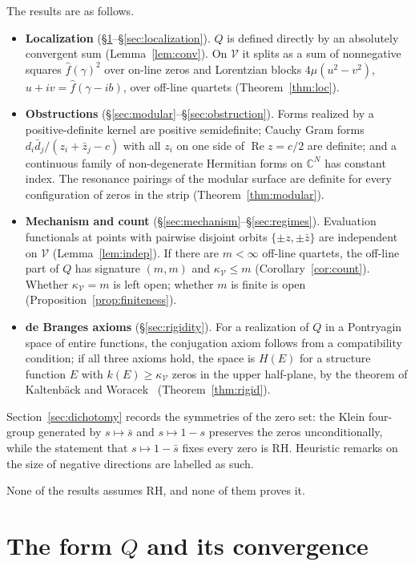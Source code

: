 \documentclass[11pt]{amsart}
\theoremstyle{definition}
\theoremstyle{remark}
\newcommand{\RH}{\mathrm{RH}}
\renewcommand{\Re}{\operatorname{Re}}
\newcommand{\fhat}{\widehat f}
\newcommand{\kV}{\kappa_{\mathcal V}}
\begin{document}
The results are as follows.
\begin{itemize}
\item \textbf{Localization} (\S\ref{sec:setup}--\S\ref{sec:localization}). $Q$ is defined
directly by an absolutely convergent sum (Lemma~\ref{lem:conv}). On $\mathcal V$ it splits as a
sum of nonnegative squares $\fhat(\gamma)^2$ over on-line zeros and Lorentzian blocks
$4\mu(u^2-v^2)$, $u+iv=\fhat(\gamma-ib)$, over off-line quartets (Theorem~\ref{thm:loc}).
\item \textbf{Obstructions} (\S\ref{sec:modular}--\S\ref{sec:obstruction}). Forms realized by a
positive-definite kernel are positive semidefinite; Cauchy Gram forms $d_i\bar d_j/(z_i+\bar
z_j-c)$ with all $z_i$ on one side of $\Re z=c/2$ are definite; and a continuous family of
non-degenerate Hermitian forms on $\mathbb C^N$ has constant index. The resonance pairings of the
modular surface are definite for every configuration of zeros in the strip
(Theorem~\ref{thm:modular}).
\item \textbf{Mechanism and count} (\S\ref{sec:mechanism}--\S\ref{sec:regimes}). Evaluation
functionals at points with pairwise disjoint orbits $\{\pm z,\pm\bar z\}$ are independent on
$\mathcal V$ (Lemma~\ref{lem:indep}). If there are $m<\infty$ off-line quartets, the off-line part
of $Q$ has signature $(m,m)$ and $\kV\le m$ (Corollary~\ref{cor:count}). Whether $\kV=m$ is left
open; whether $m$ is finite is open (Proposition~\ref{prop:finiteness}).
\item \textbf{de Branges axioms} (\S\ref{sec:rigidity}). For a realization of $Q$ in a Pontryagin
space of entire functions, the conjugation axiom follows from a compatibility condition; if all
three axioms hold, the space is $H(E)$ for a structure function $E$ with $k(E)\ge\kV$ zeros in the
upper half-plane, by the theorem of Kaltenb\"ack and Woracek~\cite{KW} (Theorem~\ref{thm:rigid}).
\end{itemize}
Section~\ref{sec:dichotomy} records the symmetries of the zero set: the Klein four-group generated
by $s\mapsto\bar s$ and $s\mapsto1-s$ preserves the zeros unconditionally, while the statement
that $s\mapsto1-\bar s$ fixes every zero is $\RH$. Heuristic remarks on the size of negative
directions are labelled as such.

None of the results assumes $\RH$, and none of them proves it.

\section{The form \texorpdfstring{$Q$}{Q} and its convergence}\label{sec:setup}
\end{document}
